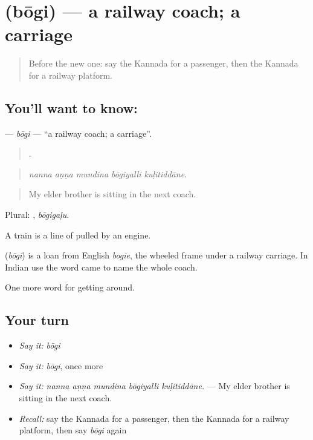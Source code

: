 \section[\texorpdfstring{\kn{ಬೋಗಿ} (bōgi)}{ಬೋಗಿ (bōgi)}]{ (bōgi) — a railway coach; a carriage}

\label{lesson:KA-C433-bogi}



\begin{quote}
Before the new one: say the Kannada for a passenger, then the Kannada for a railway platform.
\end{quote}

\subsection*{You'll want to know: }
\textbf{} — \emph{bōgi} — \textquotedblleft{}a railway coach; a carriage\textquotedblright{}.

\begin{quote}
    .
\end{quote}

\begin{quote}
\emph{nanna aṇṇa mundina bōgiyalli kuḷitiddāne.}
\end{quote}

\begin{quote}
My elder brother is sitting in the next coach.
\end{quote}

Plural: , \emph{bōgigaḷu}.

A train is a line of  pulled by an engine.

\begin{cousinweb}
\textbf{} (\emph{bōgi}) is a loan from English \emph{bogie}, the wheeled frame under a railway carriage. In Indian use the word came to name the whole coach.
\end{cousinweb}

\begin{grammarlens}[title={What you've built}]
One more word for getting around.
\end{grammarlens}

\subsection*{Your turn}
\begin{itemize}
\raggedright
  \item \emph{Say it:} \emph{bōgi}
  \item \emph{Say it:} \emph{bōgi}, once more
  \item \emph{Say it:} \emph{nanna aṇṇa mundina bōgiyalli kuḷitiddāne.} — My elder brother is sitting in the next coach.
  \item \emph{Recall:} say the Kannada for a passenger, then the Kannada for a railway platform, then say \emph{bōgi} again
\end{itemize}

